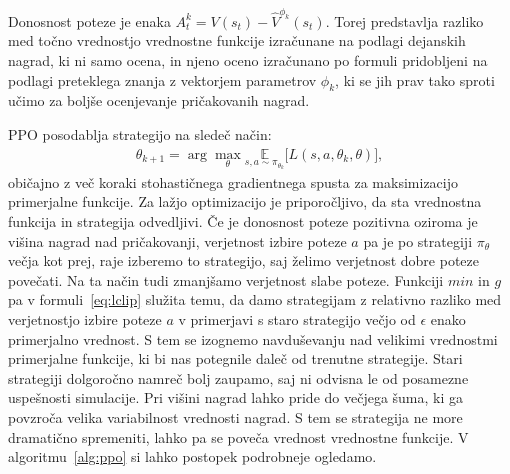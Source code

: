 Donosnost poteze je enaka $A_t^k = V(s_t) - \hat{V}^{\phi_k}(s_t)$. Torej predstavlja razliko med točno vrednostjo vrednostne funkcije izračunane na podlagi dejanskih nagrad, ki ni samo ocena, in njeno oceno izračunano po formuli pridobljeni na podlagi preteklega znanja z vektorjem parametrov $\phi_k$, ki se jih prav tako sproti učimo za boljše ocenjevanje pričakovanih nagrad.

PPO posodablja strategijo na sledeč način:
\begin{align}
\theta_{k+1} = \arg \max_{\theta} \underset{s,a \sim \pi_{\theta_k}}{\mathbb{E}}\lbrack
L(s,a,\theta_k, \theta)\rbrack, \label{eq:posodobi}
\end{align}
običajno z več koraki stohastičnega gradientnega spusta za maksimizacijo primerjalne funkcije. Za lažjo optimizacijo je priporočljivo, da sta vrednostna funkcija in strategija odvedljivi. Če je donosnost poteze pozitivna oziroma je višina nagrad nad pričakovanji, verjetnost izbire poteze $a$ pa je po strategiji $\pi_\theta$ večja kot prej, raje izberemo to strategijo, saj želimo verjetnost dobre poteze povečati. Na ta način tudi zmanjšamo verjetnost slabe poteze. Funkciji $min$ in $g$ pa v formuli~\eqref{eq:lclip} služita temu, da damo strategijam z relativno razliko med verjetnostjo izbire poteze $a$ v primerjavi s staro strategijo večjo od $\epsilon$ enako primerjalno vrednost. S tem se izognemo navduševanju nad velikimi vrednostmi primerjalne funkcije, ki bi nas potegnile daleč od trenutne strategije. Stari strategiji dolgoročno namreč bolj zaupamo, saj ni odvisna le od posamezne uspešnosti simulacije. Pri višini nagrad lahko pride do večjega šuma, ki ga povzroča velika variabilnost vrednosti nagrad. S tem se strategija ne more dramatično spremeniti, lahko pa se poveča vrednost vrednostne funkcije. V algoritmu~\ref{alg:ppo} si lahko postopek podrobneje ogledamo.

